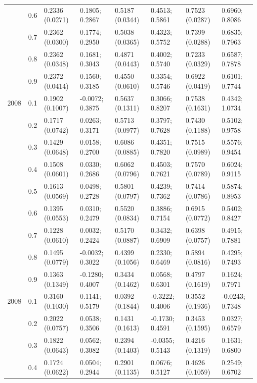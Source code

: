 \begin{table}
{\begin{tabular}[t]{llllllll}
 & 0.6 & 0.2336 (0.0271) & 0.1805; 0.2867 & 0.5187 (0.0344) & 0.4513; 0.5861 & 0.7523 (0.0287) & 0.6960; 0.8086\\
 & 0.7 & 0.2362 (0.0300) & 0.1774; 0.2950 & 0.5038 (0.0365) & 0.4323; 0.5752 & 0.7399 (0.0288) & 0.6835; 0.7963\\
 & 0.8 & 0.2362 (0.0348) & 0.1681; 0.3043 & 0.4871 (0.0443) & 0.4002; 0.5740 & 0.7233 (0.0329) & 0.6587; 0.7878\\
 & 0.9 & 0.2372 (0.0414) & 0.1560; 0.3185 & 0.4550 (0.0610) & 0.3354; 0.5746 & 0.6922 (0.0419) & 0.6101; 0.7744\\
2008 & 0.1 & 0.1902 (0.1007) & -0.0072; 0.3875 & 0.5637 (0.1311) & 0.3066; 0.8207 & 0.7538 (0.1631) & 0.4342; 1.0734\\
 & 0.2 & 0.1717 (0.0742) & 0.0263; 0.3171 & 0.5713 (0.0977) & 0.3797; 0.7628 & 0.7430 (0.1188) & 0.5102; 0.9758\\
 & 0.3 & 0.1429 (0.0648) & 0.0158; 0.2700 & 0.6086 (0.0885) & 0.4351; 0.7820 & 0.7515 (0.0989) & 0.5576; 0.9454\\
 & 0.4 & 0.1508 (0.0601) & 0.0330; 0.2686 & 0.6062 (0.0796) & 0.4503; 0.7621 & 0.7570 (0.0789) & 0.6024; 0.9115\\
 & 0.5 & 0.1613 (0.0569) & 0.0498; 0.2728 & 0.5801 (0.0797) & 0.4239; 0.7362 & 0.7414 (0.0786) & 0.5874; 0.8953\\
 & 0.6 & 0.1395 (0.0553) & 0.0310; 0.2479 & 0.5520 (0.0834) & 0.3886; 0.7154 & 0.6915 (0.0772) & 0.5402; 0.8427\\
 & 0.7 & 0.1228 (0.0610) & 0.0032; 0.2424 & 0.5170 (0.0887) & 0.3432; 0.6909 & 0.6398 (0.0757) & 0.4915; 0.7881\\
 & 0.8 & 0.1495 (0.0779) & -0.0032; 0.3022 & 0.4399 (0.1056) & 0.2330; 0.6469 & 0.5894 (0.0816) & 0.4295; 0.7493\\
 & 0.9 & 0.1363 (0.1349) & -0.1280; 0.4007 & 0.3434 (0.1462) & 0.0568; 0.6301 & 0.4797 (0.1619) & 0.1624; 0.7971\\
2008 & 0.1 & 0.3160 (0.1030) & 0.1141; 0.5179 & 0.0392 (0.1844) & -0.3222; 0.4006 & 0.3552 (0.1936) & -0.0243; 0.7348\\
 & 0.2 & 0.2022 (0.0757) & 0.0538; 0.3506 & 0.1431 (0.1613) & -0.1730; 0.4591 & 0.3453 (0.1595) & 0.0327; 0.6579\\
 & 0.3 & 0.1822 (0.0643) & 0.0562; 0.3082 & 0.2394 (0.1403) & -0.0355; 0.5143 & 0.4216 (0.1319) & 0.1631; 0.6800\\
 & 0.4 & 0.1724 (0.0622) & 0.0504; 0.2944 & 0.2901 (0.1135) & 0.0676; 0.5127 & 0.4626 (0.1059) & 0.2549; 0.6702\\

\end{tabular}}
\end{table}
